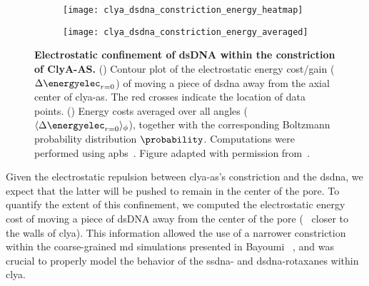 \begin{figure*}[t]
  \centering
  \medskip
  \begin{subfigure}[t]{60mm}
    \centering
    \caption{}\vspace{-5mm}\hspace{1.5mm}\label{fig:clya_dsdna_constriction_energy_heatmap}
    \texttt{[image: clya\_dsdna\_constriction\_energy\_heatmap]}
  \end{subfigure}
  \hspace{-3mm}
  \begin{subfigure}[t]{60mm}
    \centering
    \caption{}\vspace{-5mm}\hspace{1.5mm}\label{fig:clya_dsdna_constriction_energy_averaged}
    \texttt{[image: clya\_dsdna\_constriction\_energy\_averaged]}
  \end{subfigure}

\caption[Electrost. confinement of {dsDNA} within the constr. of {ClyA-AS}]{%
  \textbf{Electrostatic confinement of {dsDNA} within the constriction of {ClyA-AS}.}
  ()
  Contour plot of the electrostatic energy cost/gain ($\Delta \energyelec_{r=0}$) of moving a piece of
  \gls{dsdna} away from the axial center of \gls{clya-as}. The red crosses indicate the location of data
  points.
  ()
  Energy costs averaged over all angles ($\langle \Delta \energyelec_{r=0} \rangle_{\phi}$), together with the
  corresponding Boltzmann probability distribution $\probability$.
  Computations were performed using \gls{apbs}~\cite{Baker-2001,Baker-2005}.
  Figure adapted with permission from~\cite{Bayoumi-2020}.
  }\label{fig:clya_dsdna_constriction}
\end{figure*}


Given the electrostatic repulsion between \gls{clya-as}'s constriction and the \gls{dsdna}, we expect that the
latter will be pushed to remain in the center of the pore. To quantify the extent of this confinement, we
computed the electrostatic energy cost of moving a piece of dsDNA away from the center of the pore (\ie~
closer to the walls of \gls{clya}). This information allowed the use of a narrower constriction within the
coarse-grained \gls{md} simulations presented in Bayoumi \etal{}~\cite{Bayoumi-2020}, and was crucial to
properly model the behavior of the \gls{ssdna}- and \gls{dsdna}-rotaxanes within \gls{clya}.

